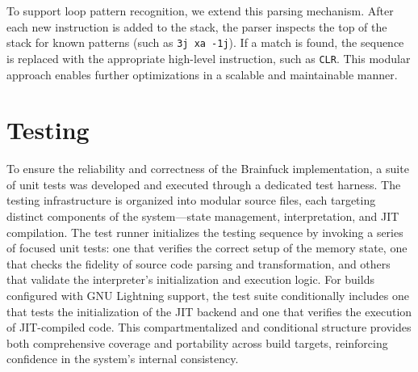 To support loop pattern recognition, we extend this parsing mechanism. After each new instruction is added to the stack, the parser inspects the top of the stack for known patterns (such as \texttt{3j xa -1j}). If a match is found, the sequence is replaced with the appropriate high-level instruction, such as \texttt{CLR}. This modular approach enables further optimizations in a scalable and maintainable manner.

\section{Testing}
\label{sec:ch2sec4}

\par To ensure the reliability and correctness of the Brainfuck implementation, a suite of unit tests was developed and executed through a dedicated test harness. The testing infrastructure is organized into modular source files, each targeting distinct components of the system—state management, interpretation, and JIT compilation. The test runner initializes the testing sequence by invoking a series of focused unit tests: one that verifies the correct setup of the memory state, one that checks the fidelity of source code parsing and transformation, and others that validate the interpreter's initialization and execution logic. For builds configured with GNU Lightning support, the test suite conditionally includes one that tests the initialization of the JIT backend and one that verifies the execution of JIT-compiled code. This compartmentalized and conditional structure provides both comprehensive coverage and portability across build targets, reinforcing confidence in the system's internal consistency.